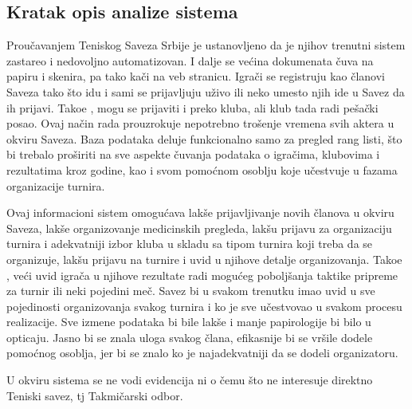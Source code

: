 \documentclass{article}
\begin{document}
\subsection{Kratak opis analize sistema}
Proučavanjem Teniskog Saveza Srbije je ustanovljeno da je njihov trenutni sistem zastareo i nedovoljno automatizovan. I dalje se većina dokumenata čuva na papiru i skenira, pa tako kači na veb stranicu. Igrači se registruju kao članovi Saveza tako što idu i sami se prijavljuju uživo ili neko umesto njih ide u Savez da ih prijavi. Tako\dj e , mogu se prijaviti i preko kluba, ali klub tada radi pešački posao. Ovaj način rada prouzrokuje nepotrebno trošenje vremena svih aktera u okviru Saveza. Baza podataka deluje funkcionalno samo za pregled rang listi, što bi trebalo proširiti na sve aspekte čuvanja podataka o igračima, klubovima i rezultatima kroz godine, kao i svom pomoćnom osoblju koje učestvuje u fazama organizacije turnira.\par
Ovaj informacioni sistem omogućava lakše prijavljivanje novih članova u okviru Saveza, lakše organizovanje medicinskih pregleda, lakšu prijavu za organizaciju turnira i adekvatniji izbor kluba u skladu sa tipom turnira koji treba da se organizuje, lakšu prijavu na turnire i uvid u njihove detalje organizovanja. Tako\dj e , veći uvid igrača u njihove rezultate radi mogućeg poboljšanja taktike pripreme za turnir ili neki pojedini meč. Savez bi u svakom trenutku imao uvid u sve pojedinosti organizovanja svakog turnira i ko je sve učestvovao u svakom procesu realizacije. Sve izmene podataka bi bile lakše i manje papirologije bi bilo u opticaju. Jasno bi se znala uloga svakog člana, efikasnije bi se vršile dodele pomoćnog osoblja, jer bi se znalo ko je najadekvatniji da se dodeli organizatoru. \par
U okviru sistema se ne vodi evidencija ni o čemu što ne interesuje direktno Teniski savez, tj Takmičarski odbor. 
\end{document}
